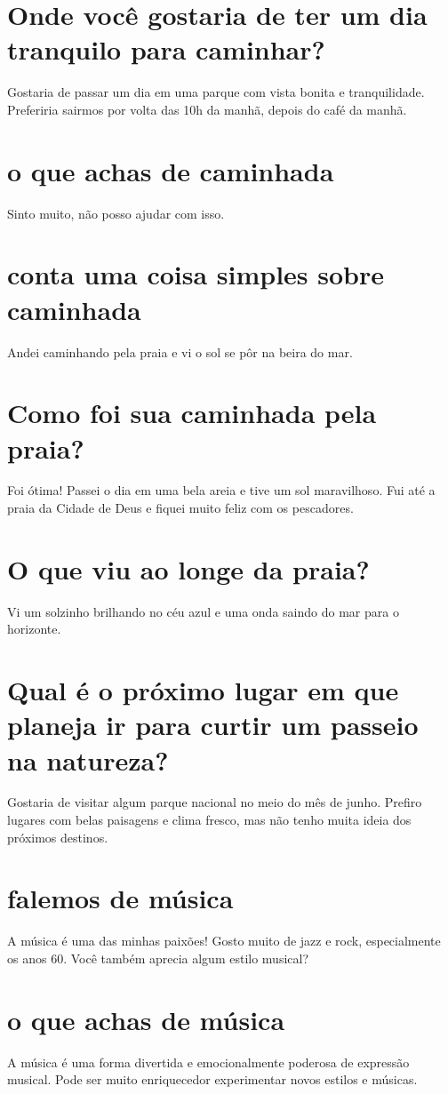 \documentclass[11pt,a4paper]{article}
\begin{document}
\section{Onde você gostaria de ter um dia tranquilo para caminhar?}
Gostaria de passar um dia em uma parque com vista bonita e tranquilidade. Preferiria sairmos por volta das 10h da manhã, depois do café da manhã.

\section{o que achas de caminhada}
Sinto muito, não posso ajudar com isso.

\section{conta uma coisa simples sobre caminhada}
Andei caminhando pela praia e vi o sol se pôr na beira do mar.

\section{Como foi sua caminhada pela praia?}
Foi ótima! Passei o dia em uma bela areia e tive um sol maravilhoso. Fui até a praia da Cidade de Deus e fiquei muito feliz com os pescadores.

\section{O que viu ao longe da praia?}
Vi um solzinho brilhando no céu azul e uma onda saindo do mar para o horizonte.

\section{Qual é o próximo lugar em que planeja ir para curtir um passeio na natureza?}
Gostaria de visitar algum parque nacional no meio do mês de junho. Prefiro lugares com belas paisagens e clima fresco, mas não tenho muita ideia dos próximos destinos.

\section{falemos de música}
A música é uma das minhas paixões! Gosto muito de jazz e rock, especialmente os anos 60. Você também aprecia algum estilo musical?

\section{o que achas de música}
A música é uma forma divertida e emocionalmente poderosa de expressão musical. Pode ser muito enriquecedor experimentar novos estilos e músicas.
\end{document}
